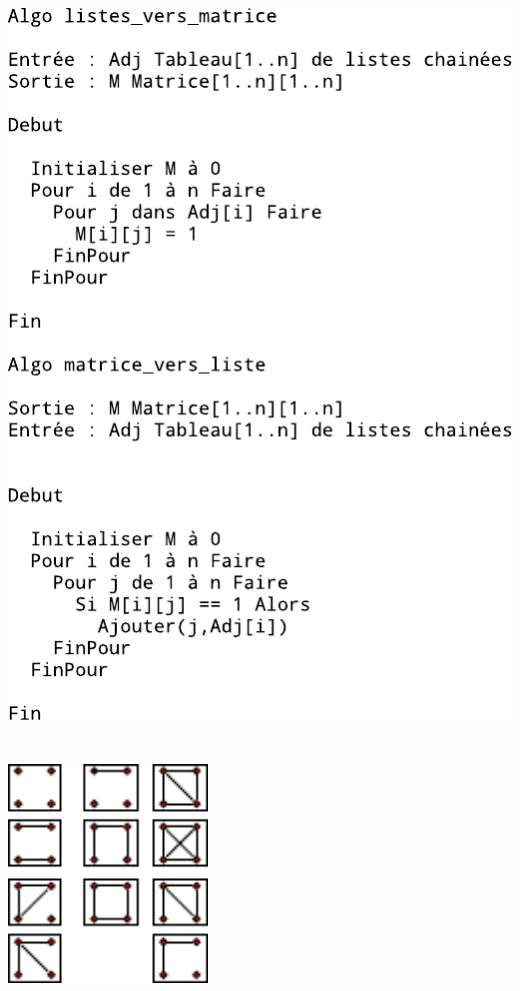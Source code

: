 \\
\\
\includegraphics{Images/fig19.pdf}
\\
\newpage
{}\\
\\
\includegraphics[width=200px]{Images/fig20.pdf}
